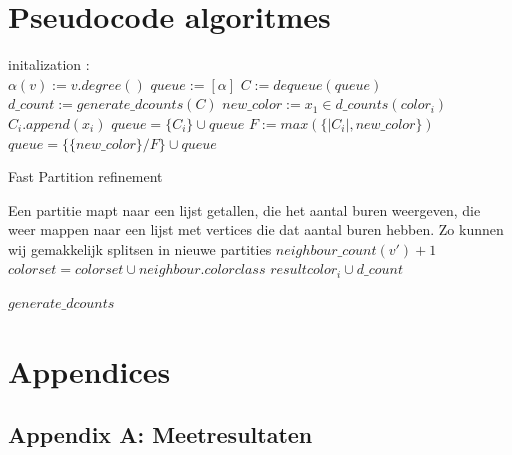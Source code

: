\documentclass[twoside]{article}
\begin{document}
\section{Pseudocode algoritmes}
\begin{algorithm}[]
initalization \;
: \\
{$\alpha(v) := v.degree()$}
$queue := [\alpha]$\;
{$C := dequeue(queue)$\;
$d\_count := generate\_dcounts(C)$\;
{
{$new\_color := x_{1} \in d\_counts(color_{i})$ \;
{$C_{i}.append(x_{i}) $ }
{$ queue = \{C_{i}\} \cup queue $ \;}
{	$ F := max(\{|C_{i}|, new\_color \} ) $ \;
$queue = \{ \{new\_color \} / F \} \cup queue $}}}}
\caption{Fast Partition refinement}
\EndFunction
\end{algorithm}

\begin{algorithm}[]
Een partitie mapt naar een lijst getallen, die het aantal buren weergeven, die weer mappen naar een lijst met vertices die dat aantal buren hebben. Zo kunnen wij gemakkelijk splitsen in nieuwe partities \;
{
{$ neighbour\_count(v') + 1 $ \;
$ colorset = colorset \cup  neighbour.colorclass  $  \;}}
{
$ result color_{i} \cup d\_count $}
\caption{$ generate\_dcounts $}
\end{algorithm}

\newpage
\section{Appendices}
\subsection{Appendix A: Meetresultaten} \label{AppendixA}
\end{document}
